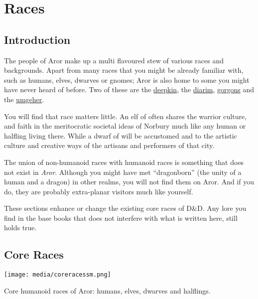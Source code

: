 \chapter{Races}
\label{sec:Races}

\section{Introduction}

The people of Aror make up a multi flavoured stew of various races and
backgrounds. Apart from many races that you might be already familiar with,
such as humans, elves, dwarves or gnomes; Aror is also home to some you might
have never heard of before. Two of these are the
\hyperref[sec:Deepkin]{deepkin}, the \hyperref[sec:Diarim]{diarim},
\hyperref[sec:Gorgons]{gorgons} and the \hyperref[sec:Umgeher]{umgeher}.

You will find that race matters little. An elf of  often
shares the warrior culture, and faith in the meritocratic societal ideas
of Norbury much like any human or halfling living there. While a dwarf of
 will be accustomed and to the artistic culture and
creative ways of the artisans and performers of that city.

The union of non-humanoid races with humanoid races is something that does not
exist in \emph{Aror}. Although you might have met ``dragonborn'' (the unity of
a human and a dragon) in other realms, you will not find them on Aror. And if
you do, they are probably extra-planar visitors much like yourself.

\begin{note}
  These sections enhance or change the existing core races of D\&D. Any lore you
  find in the base books that does not interfere with what is written here, still
  holds true.
\end{note}

\section{Core Races}
\label{sec:Core Races}

\begin{figure*}[ht!]
    \centering
    \vspace{-2.6cm}
    \centerline{
        \texttt{[image: media/coreracessm.png]}
    }
    \par
    Core humanoid races of Aror: humans, elves, dwarves and halflings.
\end{figure*}


